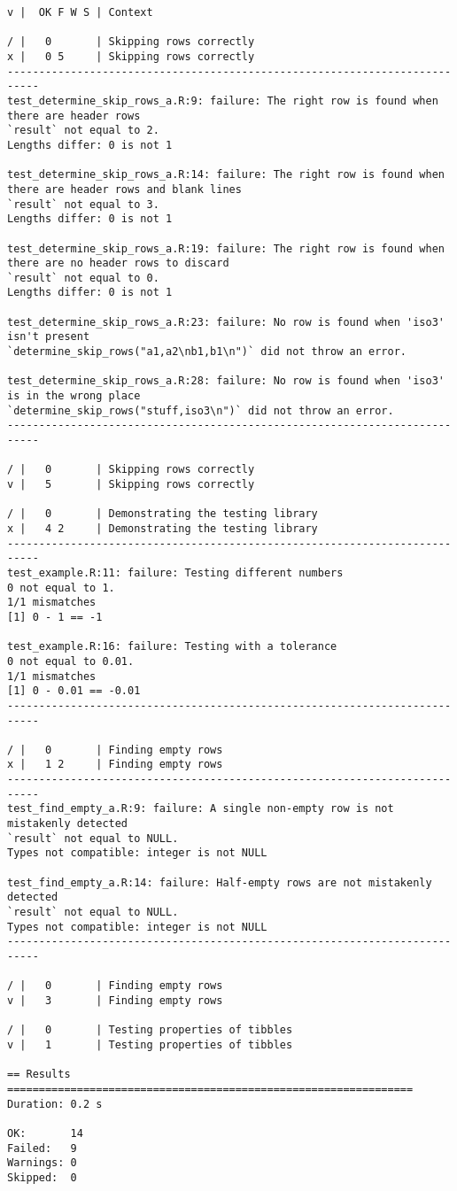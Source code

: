 \begin{lstlisting}
v |  OK F W S | Context

/ |   0       | Skipping rows correctly
x |   0 5     | Skipping rows correctly
---------------------------------------------------------------------------
test_determine_skip_rows_a.R:9: failure: The right row is found when there are header rows
`result` not equal to 2.
Lengths differ: 0 is not 1

test_determine_skip_rows_a.R:14: failure: The right row is found when there are header rows and blank lines
`result` not equal to 3.
Lengths differ: 0 is not 1

test_determine_skip_rows_a.R:19: failure: The right row is found when there are no header rows to discard
`result` not equal to 0.
Lengths differ: 0 is not 1

test_determine_skip_rows_a.R:23: failure: No row is found when 'iso3' isn't present
`determine_skip_rows("a1,a2\nb1,b1\n")` did not throw an error.

test_determine_skip_rows_a.R:28: failure: No row is found when 'iso3' is in the wrong place
`determine_skip_rows("stuff,iso3\n")` did not throw an error.
---------------------------------------------------------------------------

/ |   0       | Skipping rows correctly
v |   5       | Skipping rows correctly

/ |   0       | Demonstrating the testing library
x |   4 2     | Demonstrating the testing library
---------------------------------------------------------------------------
test_example.R:11: failure: Testing different numbers
0 not equal to 1.
1/1 mismatches
[1] 0 - 1 == -1

test_example.R:16: failure: Testing with a tolerance
0 not equal to 0.01.
1/1 mismatches
[1] 0 - 0.01 == -0.01
---------------------------------------------------------------------------

/ |   0       | Finding empty rows
x |   1 2     | Finding empty rows
---------------------------------------------------------------------------
test_find_empty_a.R:9: failure: A single non-empty row is not mistakenly detected
`result` not equal to NULL.
Types not compatible: integer is not NULL

test_find_empty_a.R:14: failure: Half-empty rows are not mistakenly detected
`result` not equal to NULL.
Types not compatible: integer is not NULL
---------------------------------------------------------------------------

/ |   0       | Finding empty rows
v |   3       | Finding empty rows

/ |   0       | Testing properties of tibbles
v |   1       | Testing properties of tibbles

== Results ================================================================
Duration: 0.2 s

OK:       14
Failed:   9
Warnings: 0
Skipped:  0
\end{lstlisting}

